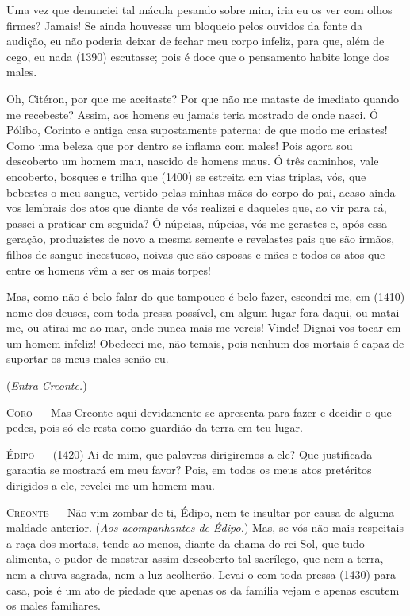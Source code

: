 Uma vez que denunciei tal mácula pesando sobre mim, iria eu os ver com
olhos firmes? Jamais! Se ainda houvesse um bloqueio pelos ouvidos da
fonte da audição, eu não poderia deixar de fechar meu corpo infeliz,
para que, além de cego, eu nada (1390) escutasse; pois é doce que o
pensamento habite longe dos males.

Oh, Citéron, por que me aceitaste? Por que não me mataste de imediato
quando me recebeste? Assim, aos homens eu jamais teria mostrado de onde
nasci. Ó Pólibo, Corinto e antiga casa supostamente paterna: de que modo
me criastes! Como uma beleza que por dentro se inflama com males! Pois
agora sou descoberto um homem mau, nascido de homens maus. Ó três
caminhos, vale encoberto, bosques e trilha que (1400) se estreita em
vias triplas, vós, que bebestes o meu sangue, vertido pelas minhas mãos
do corpo do pai, acaso ainda vos lembrais dos atos que diante de vós
realizei e daqueles que, ao vir para cá, passei a praticar em seguida? Ó
núpcias, núpcias, vós me gerastes e, após essa geração, produzistes de
novo a mesma semente e revelastes pais que são irmãos, filhos de sangue
incestuoso, noivas que são esposas e mães e todos os atos que entre os
homens vêm a ser os mais torpes!

Mas, como não é belo falar do que tampouco é belo fazer, escondei-me, em
(1410) nome dos deuses, com toda pressa possível, em algum lugar fora
daqui, ou matai-me, ou atirai-me ao mar, onde nunca mais me vereis!
Vinde! Dignai-vos tocar em um homem infeliz! Obedecei-me, não temais,
pois nenhum dos mortais é capaz de suportar os meus males senão eu.

(\emph{Entra Creonte.})

\textsc{Coro} --- Mas Creonte aqui devidamente se apresenta para fazer e decidir o que
pedes, pois só ele resta como guardião da terra em teu lugar.

\textsc{Édipo} --- (1420) Ai de mim, que palavras dirigiremos a ele? Que justificada
garantia se mostrará em meu favor? Pois, em todos os meus atos
pretéritos dirigidos a ele, revelei-me um homem mau.

\textsc{Creonte} --- Não vim zombar de ti, Édipo, nem te insultar por causa de alguma maldade
anterior. (\emph{Aos acompanhantes de Édipo.}) Mas, se vós não mais
respeitais a raça dos mortais, tende ao menos, diante da chama do rei
Sol, que tudo alimenta, o pudor de mostrar assim descoberto tal
sacrílego, que nem a terra, nem a chuva sagrada, nem a luz acolherão.
Levai-o com toda pressa (1430) para casa, pois é um ato de piedade que
apenas os da família vejam e apenas escutem os males familiares.

